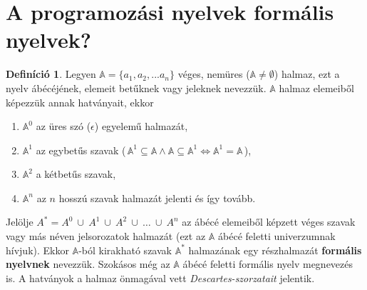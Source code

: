 \documentclass[tocnopagenum]{thesis-ekf}
\theoremstyle{definition}
\newtheorem{definicio}[tetel]{Definíció}
\theoremstyle{remark}
\begin{document}
	\section{A programozási nyelvek formális nyelvek?}
	\begin{definicio}
		Legyen $\mathbb{A} = \{a_1, a_2, ... a_n\}$ véges, nemüres ($ \mathbb{A} \neq \emptyset$) halmaz, ezt a nyelv ábécéjének, elemeit betűknek vagy jeleknek nevezzük. $\mathbb{A}$ halmaz elemeiből képezzük annak hatványait, ekkor 
		\begin{enumerate}
			\item $\mathbb{A} ^ {0}$ az üres szó ($\epsilon$) egyelemű halmazát, 
			\item $\mathbb{A} ^ {1} $ az egybetűs szavak (\,$\mathbb{A}^{1}\subseteq\mathbb{A}\wedge\mathbb{A}\subseteq\mathbb{A}^{1} \iff \mathbb{A}^{1}=\mathbb{A}$\,), 
			\item $\mathbb{A}^{2}$ a kétbetűs szavak, 
			\item $\mathbb{A}^{n}$ az $n$ hosszú szavak halmazát jelenti és így tovább.
		\end{enumerate}
		Jelölje $A^{*}=A^{0}\ \cup\ A^{1}\ \cup\ A^{2}\ \cup\ \dots\ \cup\  A^{n}$ az ábécé elemeiből képzett véges szavak vagy más néven jelsorozatok halmazát (ezt az $\mathbb{A}$ ábécé feletti univerzumnak hívjuk). Ekkor  $\mathbb{A}$-ból kirakható szavak $\mathbb{A}^{*}$ halmazának egy részhalmazát \textbf{formális nyelvnek} nevezzük. Szokásos még az $\mathbb{A}$ ábécé feletti formális nyelv megnevezés is. A hatványok a halmaz önmagával vett \emph{Descartes-szorzatait} jelentik.
		\cite{formnyelvek}
	\end{definicio}
	
\end{document}
